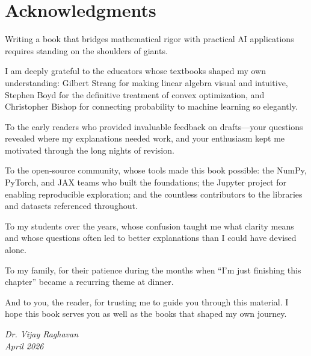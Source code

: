 \documentclass[../main.tex]{subfiles}
\begin{document}
\chapter*{Acknowledgments}
\thispagestyle{empty}

Writing a book that bridges mathematical rigor with practical AI applications requires standing on the shoulders of giants.

I am deeply grateful to the educators whose textbooks shaped my own understanding: Gilbert Strang for making linear algebra visual and intuitive, Stephen Boyd for the definitive treatment of convex optimization, and Christopher Bishop for connecting probability to machine learning so elegantly.

To the early readers who provided invaluable feedback on drafts---your questions revealed where my explanations needed work, and your enthusiasm kept me motivated through the long nights of revision.

To the open-source community, whose tools made this book possible: the NumPy, PyTorch, and JAX teams who built the foundations; the Jupyter project for enabling reproducible exploration; and the countless contributors to the libraries and datasets referenced throughout.

To my students over the years, whose confusion taught me what clarity means and whose questions often led to better explanations than I could have devised alone.

To my family, for their patience during the months when ``I'm just finishing this chapter'' became a recurring theme at dinner.

And to you, the reader, for trusting me to guide you through this material. I hope this book serves you as well as the books that shaped my own journey.

\vspace{1cm}
\hfill\textit{Dr. Vijay Raghavan}\\
\hfill\textit{April 2026}

\cleardoublepage
\end{document}
